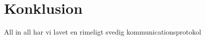 \chapter{Konklusion}\label{ch:konclusion}
All in all har vi lavet en rimeligt svedig kommunicationsprotokol